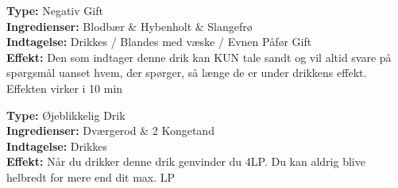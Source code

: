 \begin{gift*}[Sandhedsdrik]
\textbf{Type:} Negativ Gift\\
\textbf{Ingredienser:} Blodbær \& Hybenholt \& Slangefrø\\
\textbf{Indtagelse:} Drikkes / Blandes med væske / Evnen Påfør Gift\\
\textbf{Effekt:} Den som indtager denne drik kan KUN tale sandt og vil altid svare på spørgsmål uanset hvem, der spørger, så længe de er under drikkens effekt. Effekten virker i 10 min \\
\end{gift*}

\begin{drik*}
\textbf{Type:} Øjeblikkelig Drik\\
\textbf{Ingredienser:} Dværgerod \& 2 Kongetand\\
\textbf{Indtagelse:} Drikkes\\
\textbf{Effekt:} Når du drikker denne drik genvinder du 4LP. Du kan aldrig blive helbredt for mere end dit max. LP\\
\end{drik*}
